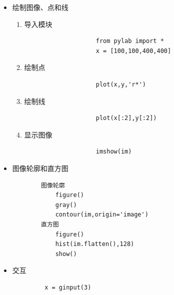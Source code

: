 \documentclass[a4paper,12pt]{article}
\begin{document}
\begin{itemize}
    \item 绘制图像、点和线
            \begin{enumerate}
                \item 导入模块
                    \begin{verbatim}
                    from pylab import *
                    x = [100,100,400,400]
                    \end{verbatim}
                \item 绘制点
                    \begin{verbatim}
                    plot(x,y,'r*')
                    \end{verbatim}
                \item 绘制线
                    \begin{verbatim}
                    plot(x[:2],y[:2])
                    \end{verbatim}
                \item 显示图像
                    \begin{verbatim}
                    imshow(im)
                    \end{verbatim}
            \end{enumerate}
    \item 图像轮廓和直方图
        \begin{verbatim}
        图像轮廓
            figure()
            gray()
            contour(im,origin='image')
        直方图
            figure()
            hist(im.flatten(),128)
            show()
        \end{verbatim}
    \item 交互
       \begin{verbatim}
         x = ginput(3)
       \end{verbatim}
        
\end{itemize}
\end{document}
